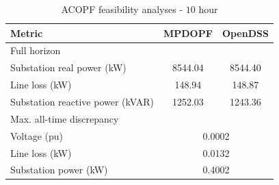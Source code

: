\documentclass[../../outputs/main.tex]{subfiles}
\begin{document}
\begin{table}[t]
    \centering
    \caption{ACOPF feasibility analyses - $10$ hour}
    \begin{tabular}{|l|c|c|}
    \hline
    \textbf{Metric} & \textbf{MPDOPF} & \textbf{OpenDSS} \\ \hline
    Full horizon  & \multicolumn{2}{c|}{} \\ \hline
    \quad Substation real power (kW) & 8544.04 & 8544.40 \\ \hline
    \quad Line loss (kW) & 148.94 & 148.87 \\ \hline
    \quad Substation reactive power (kVAR) & 1252.03 & 1243.36 \\ \hline
    Max. all-time discrepancy & \multicolumn{2}{c|}{} \\ \hline
    \quad Voltage (pu) & \multicolumn{2}{c|}{0.0002} \\ \hline
    \quad Line loss (kW) & \multicolumn{2}{c|}{0.0132} \\ \hline
    \quad Substation power (kW) & \multicolumn{2}{c|}{0.4002} \\ \hline
    \end{tabular}
    \label{table:feas-copf-10-20-30}
    \vspace{-3mm}
\end{table}

\end{document}
